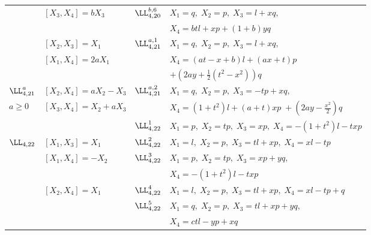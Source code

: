 \begin{table}
\begin{center}
\begin{tabular}{|l|l|l|l|}
 & $[X_3,X_4]=bX_3$& $\LL_{4,20}^{b,6}$ & $X_1=q,\;X_2=p,\;X_3=l+xq,$\\
 &  &   &  $X_4=btl+xp+(1+b)yq$\\
\hline
 & $[X_2,X_3]=X_1$ & $\LL_{4,21}^{a,1}$ & $X_1=q,\; X_2=p,\;X_3=l+xq,$\\
 & $[X_1,X_4]=2aX_1$ &  & $X_4=(at-x+b)l+(ax+t)p$\\
 &   &  & $+\left (2ay+\displaystyle{
                                   \frac{1}{2}}(t^2-x^2) \right )q$ \\
\cline{3-4}
$\LL_{4,21}^a$ & $[X_2,X_4]=aX_2-X_3$ & $\LL_{4,21}^{a,2}$ &
                                            $ X_1=q,\;X_2=p,\;X_3=-tp+xq,$\\
$a\ge 0$ & $[X_3,X_4]=X_2+aX_3$ &       & $X_4=(1+t^2)l+(a+t)xp\;
                          +\left (2ay-\displaystyle{\frac{x^2}{2}}\right )q$\\
\hline
 &  & $\LL_{4,22}^1$ & $X_1=p,\;X_2=tp,\;X_3=xp,\;X_4=-(1+t^2)l-txp$\\
\cline{3-4}
$\LL_{4,22}$& $[X_1,X_3]=X_1$& $\LL_{4,22}^2$ & $X_1=l,\;X_2=p,\;  
                                         X_3=tl+xp,\;X_4=xl-tp$\\
\cline{3-4}
 & $[X_1,X_4]=-X_2$ & $\LL_{4,22}^3$ & $X_1=p,\;X_2=tp,\;X_3=xp+yq,$\\ 
&  &  &                               $X_4=-(1+t^2)l-txp$\\
\cline{3-4}
& $[X_2,X_4]=X_1$ & $\LL_{4,22}^4$ & $X_1=l,\;X_2=p,\;X_3=tl+xp,\;
                                               X_4=xl-tp+q$\\  
\cline{3-4}                                     
 &  & $\LL_{4,22}^5$ & $X_1=q,\;X_2=p,\;X_3=tl+xp+yq,$\\
 &   &   & $X_4=ctl-yp+xq$\\
\hline
\end{tabular}
\end{center}
\end{table}

%
 
